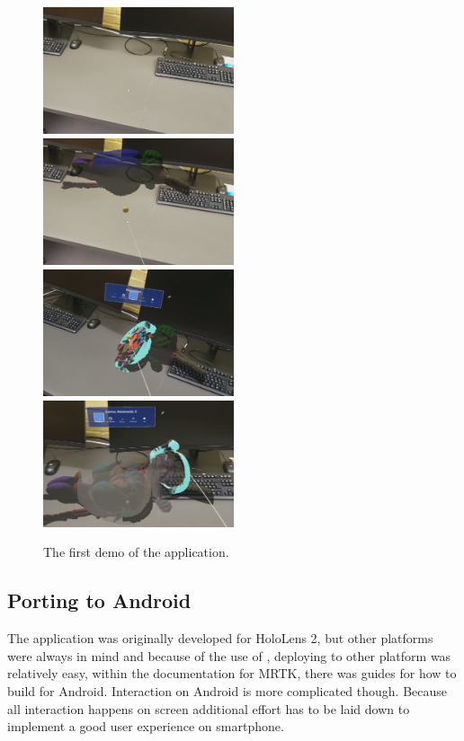 \begin{figure}[h]
    \includegraphics[width=0.5\textwidth]{fig/mvpdemo1.png}
    \includegraphics[width=0.5\textwidth]{fig/mvpdemo2.png}
    \includegraphics[width=0.5\textwidth]{fig/mvpdemo3.png}
    \includegraphics[width=0.5\textwidth]{fig/mvpdemo4.png}
    \caption{The first demo of the application.}
    \label{fig:mvpdemo}
\end{figure}




\subsection*{Porting to Android}
The application was originally developed for HoloLens 2, but other platforms were always in mind and because of the use of , deploying to other platform was relatively easy, within the documentation for MRTK, there was guides for how to build for Android. Interaction on Android is more complicated though. Because all interaction happens on screen additional effort has to be laid down to implement a good user experience on smartphone.  








